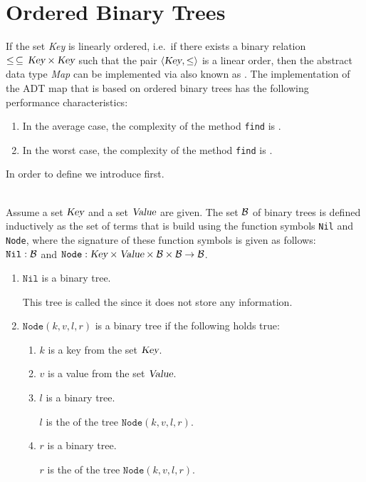 \section{Ordered Binary Trees}
If the set \textsl{Key} is linearly ordered, i.e.~if there exists a binary relation
$\leq \,\subseteq\,\textsl{Key}\times\textsl{Key}$ such that the pair $\langle \textsl{Key}, \leq \rangle$ is a linear
order, then the abstract data type \textsl{Map} can be implemented via  
\href{https://en.wikipedia.org/wiki/Binary_search_tree}{} also known as
. 
The implementation of the ADT map that is based on ordered binary trees has the following performance
characteristics: 
\begin{enumerate}
\item In the average case, the complexity of the method \texttt{find} is .
\item In the worst case, the complexity of the method \texttt{find} is .  
\end{enumerate}
In order to define  we introduce  first.

\begin{Definition} \hspace*{\fill} \\
  Assume a set $\textsl{Key}$ and a set $\textsl{Value}$ are given.
  The set $\mathcal{B}$ of binary trees is defined inductively as the set of terms that is build using the
  function symbols \texttt{Nil} and \texttt{Node}, where the signature of these function symbols is
  given as follows: \\[0.2cm]
  \hspace*{1.3cm} 
  $\texttt{Nil}: \mathcal{B}$ \qquad and \qquad  $\texttt{Node}: \textsl{Key} \times \textsl{Value} \times \mathcal{B} \times \mathcal{B} \rightarrow \mathcal{B}$.
  \begin{enumerate}
  \item $\texttt{Nil}$ is a binary tree.

        This tree is called the  since it does not store any information.
  \item $\texttt{Node}(k, v, l, r)$ is a binary tree if the following holds true: 
        \begin{enumerate}
        \item $k$ is a key from the set $\textsl{Key}$.
        \item $v$ is a value from the set $\textsl{Value}$.
        \item $l$ is a binary tree.

              $l$ is the   of the tree $\texttt{Node}(k, v, l, r)$.
        \item $r$ is a binary tree.

              $r$ is the  of the tree $\texttt{Node}(k, v, l, r)$.
              \eox
        \end{enumerate}
  \end{enumerate}
\end{Definition}

